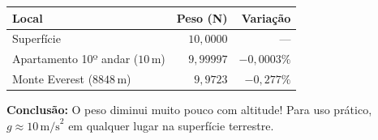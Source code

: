 \begin{center}
\begin{tabular}{lrr}
\hline
\textbf{Local} & \textbf{Peso (N)} & \textbf{Variação} \\
\hline
Superfície & $10{,}0000$ & --- \\
Apartamento 10º andar ($10\,\text{m}$) & $9{,}99997$ & $-0{,}0003\%$ \\
Monte Everest ($8848\,\text{m}$) & $9{,}9723$ & $-0{,}277\%$ \\
\hline
\end{tabular}
\end{center}

\textbf{Conclusão:} O peso diminui muito pouco com altitude! Para uso prático, $g \approx 10\,\text{m/s}^2$ em qualquer lugar na superfície terrestre.